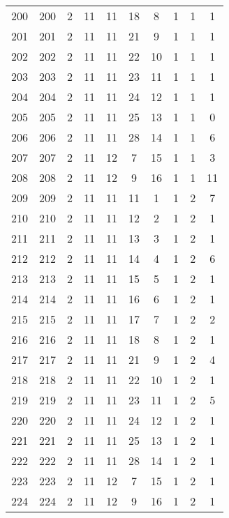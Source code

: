 \begin{longtable}{cccccccccc}
  200 & 200 &   2 &  11 &  11 &  18 &   8 &   1 &   1 &   1 \\ 
  201 & 201 &   2 &  11 &  11 &  21 &   9 &   1 &   1 &   1 \\ 
  202 & 202 &   2 &  11 &  11 &  22 &  10 &   1 &   1 &   1 \\ 
  203 & 203 &   2 &  11 &  11 &  23 &  11 &   1 &   1 &   1 \\ 
  204 & 204 &   2 &  11 &  11 &  24 &  12 &   1 &   1 &   1 \\ 
  205 & 205 &   2 &  11 &  11 &  25 &  13 &   1 &   1 &   0 \\ 
  206 & 206 &   2 &  11 &  11 &  28 &  14 &   1 &   1 &   6 \\ 
  207 & 207 &   2 &  11 &  12 &   7 &  15 &   1 &   1 &   3 \\ 
  208 & 208 &   2 &  11 &  12 &   9 &  16 &   1 &   1 &  11 \\ 
  209 & 209 &   2 &  11 &  11 &  11 &   1 &   1 &   2 &   7 \\ 
  210 & 210 &   2 &  11 &  11 &  12 &   2 &   1 &   2 &   1 \\ 
  211 & 211 &   2 &  11 &  11 &  13 &   3 &   1 &   2 &   1 \\ 
  212 & 212 &   2 &  11 &  11 &  14 &   4 &   1 &   2 &   6 \\ 
  213 & 213 &   2 &  11 &  11 &  15 &   5 &   1 &   2 &   1 \\ 
  214 & 214 &   2 &  11 &  11 &  16 &   6 &   1 &   2 &   1 \\ 
  215 & 215 &   2 &  11 &  11 &  17 &   7 &   1 &   2 &   2 \\ 
  216 & 216 &   2 &  11 &  11 &  18 &   8 &   1 &   2 &   1 \\ 
  217 & 217 &   2 &  11 &  11 &  21 &   9 &   1 &   2 &   4 \\ 
  218 & 218 &   2 &  11 &  11 &  22 &  10 &   1 &   2 &   1 \\ 
  219 & 219 &   2 &  11 &  11 &  23 &  11 &   1 &   2 &   5 \\ 
  220 & 220 &   2 &  11 &  11 &  24 &  12 &   1 &   2 &   1 \\ 
  221 & 221 &   2 &  11 &  11 &  25 &  13 &   1 &   2 &   1 \\ 
  222 & 222 &   2 &  11 &  11 &  28 &  14 &   1 &   2 &   1 \\ 
  223 & 223 &   2 &  11 &  12 &   7 &  15 &   1 &   2 &   1 \\ 
  224 & 224 &   2 &  11 &  12 &   9 &  16 &   1 &   2 &   1 \\ 

\end{longtable}
